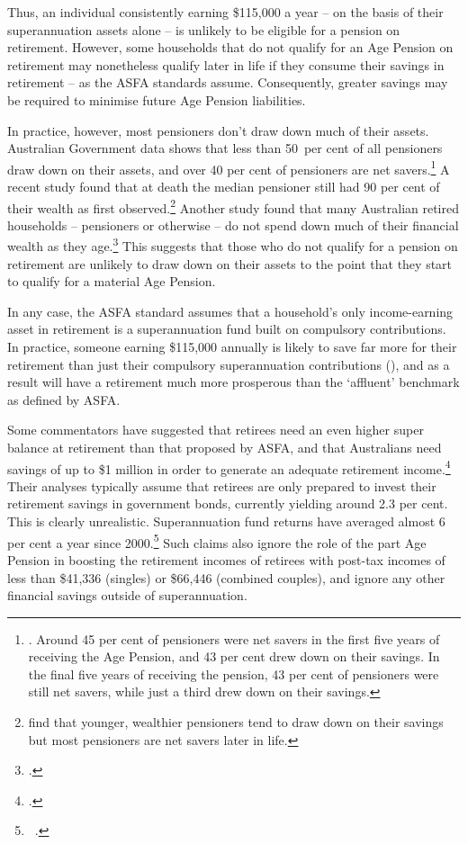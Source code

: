 Thus, an individual consistently earning \$115,000 a year -- on the basis of their superannuation assets alone -- is unlikely to be eligible for a pension on retirement. However, some households that do not qualify for an Age Pension on retirement may nonetheless qualify later in life if they consume their savings in retirement – as the ASFA standards assume. Consequently, greater savings may be required to minimise future Age Pension liabilities.

In practice, however, most pensioners don’t draw down much of their assets. Australian Government data shows that less than 50~per cent of all pensioners draw down on their assets, and over 40 per cent of pensioners are net savers.\footnote{\textcite{Morrison2015TheBestFormOfWelfare}. Around 45 per cent of pensioners were net savers in the first five years of receiving the Age Pension, and 43 per cent drew down on their savings. In the final five years of receiving the pension, 43 per cent of pensioners were still net savers, while just a third drew down on their savings.}  
A recent study found that at death the median pensioner still had 90 per cent of their wealth as first observed.\footnote{\textcite{WuAsherMeyrickeEtAl2015} find that younger, wealthier pensioners tend to draw down on their savings but most pensioners are net savers later in life.} Another study found that many Australian retired households – pensioners or otherwise – do not spend down much of their financial wealth as they age.\footcite{SpicerStavrunovaThorp2015} This suggests that those who do not qualify for a pension on retirement are unlikely to draw down on their assets to the point that they start to qualify for a material Age Pension. 

In any case, the ASFA standard assumes that a household’s only income-earning asset in retirement is a superannuation fund built on compulsory contributions. In practice, someone earning \$115,000 annually is likely to save far more for their retirement than just their compulsory superannuation contributions (), and as a result will have a retirement much more prosperous than the ‘affluent’ benchmark as defined by ASFA. 

Some commentators have suggested that retirees need an even higher super balance at retirement than that proposed by ASFA, and that Australians need savings of up to \$1 million in order to generate an adequate retirement income.\footcite{Cooper2015}  Their analyses typically assume that retirees are only prepared to invest their retirement savings in government bonds, currently yielding around 2.3 per cent. This is clearly unrealistic. Superannuation fund returns have averaged almost 6 per cent a year since 2000.\footnote{\gao\ \textcite{APRA2015JuneSuperPerformance}.} 
Such claims also ignore the role of the part Age Pension in boosting the retirement incomes of retirees with post-tax incomes of less than \$41,336 (singles) or \$66,446 (combined couples), and ignore any other financial savings outside of superannuation.%

